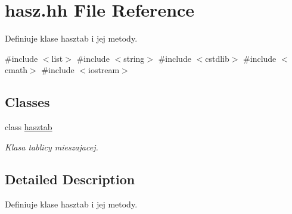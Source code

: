 \hypertarget{hasz_8hh}{\section{hasz.\-hh \-File \-Reference}
\label{hasz_8hh}
}


\-Definiuje klase hasztab i jej metody.  


{\ttfamily \#include $<$list$>$}\*
{\ttfamily \#include $<$string$>$}\*
{\ttfamily \#include $<$cstdlib$>$}\*
{\ttfamily \#include $<$cmath$>$}\*
{\ttfamily \#include $<$iostream$>$}\*
\subsection*{\-Classes}
\begin{DoxyCompactItemize}
\item 
class \hyperlink{classhasztab}{hasztab}
\begin{DoxyCompactList}\small\item\em \-Klasa tablicy mieszajacej. \end{DoxyCompactList}\end{DoxyCompactItemize}


\subsection{\-Detailed \-Description}
\-Definiuje klase hasztab i jej metody. 